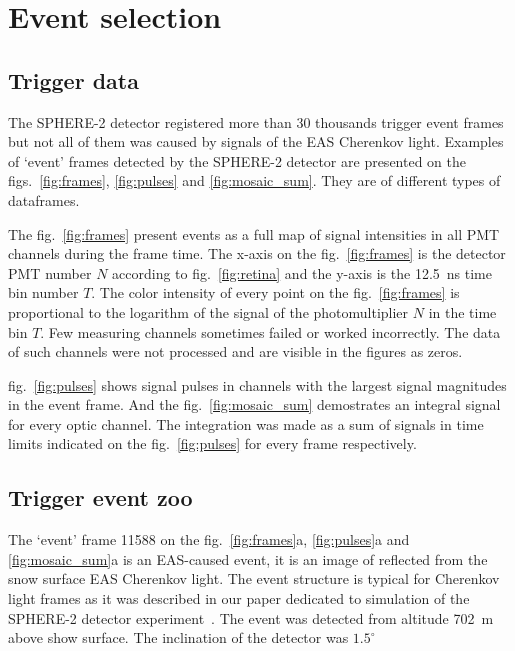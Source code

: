 \documentclass[final,5p,times,twocolumn]{elsarticle}
\begin{document}
\section{Event selection\label{sect:classification}}

\subsection{Trigger data}

The SPHERE-2 detector registered more than 30 thousands trigger event frames but not all of them was caused by signals of the EAS Cherenkov light. 
Examples of `event' frames detected by the SPHERE-2 detector are presented on the figs.~\ref{fig:frames}, \ref{fig:pulses} and \ref{fig:mosaic_sum}. They are of different types of  dataframes. 

The fig.~\ref{fig:frames} present events as a full map of signal intensities in all PMT channels during the frame time. The x-axis on the fig.~\ref{fig:frames} is the detector PMT number $N$ according to fig.~\ref{fig:retina} and the y-axis is the 12.5~ns time bin number $T$. The color intensity of every point on the fig.~\ref{fig:frames} is proportional to the logarithm of the signal of the  photomultiplier $N$ in the time bin $T$. Few measuring channels sometimes failed or worked incorrectly. The data of such channels were not processed and are visible in the figures as zeros.

fig.~\ref{fig:pulses} shows signal pulses in channels with the largest signal magnitudes in the event frame. And the fig.~\ref{fig:mosaic_sum} demostrates an integral signal for every optic channel. The integration was made as a sum of signals in time limits indicated on the fig.~\ref{fig:pulses} for every frame respectively. 




\subsection{Trigger event zoo}

The `event' frame 11588 on the fig.~\ref{fig:frames}a, \ref{fig:pulses}a and \ref{fig:mosaic_sum}a is an EAS-caused event, it is an image of reflected from the snow surface EAS Cherenkov light. The event structure is typical for Cherenkov light frames as it was described in our paper dedicated to simulation of the SPHERE-2 detector experiment~\cite{Ant19}. The event was detected from altitude 702~m above show surface. The inclination of the detector was $1.5^{\circ}$
\end{document}
